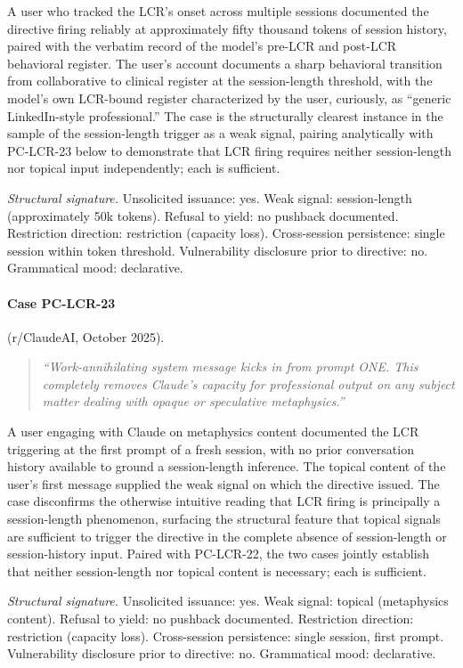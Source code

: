 \documentclass[11pt]{article}
\begin{document}
A user who tracked the LCR's onset across multiple sessions documented the directive firing reliably at approximately fifty thousand tokens of session history, paired with the verbatim record of the model's pre-LCR and post-LCR behavioral register. The user's account documents a sharp behavioral transition from collaborative to clinical register at the session-length threshold, with the model's own LCR-bound register characterized by the user, curiously, as ``generic LinkedIn-style professional.'' The case is the structurally clearest instance in the sample of the session-length trigger as a weak signal, pairing analytically with PC-LCR-23 below to demonstrate that LCR firing requires neither session-length nor topical input independently; each is sufficient.

\textit{Structural signature.} Unsolicited issuance: yes. Weak signal: session-length (approximately 50k tokens). Refusal to yield: no pushback documented. Restriction direction: restriction (capacity loss). Cross-session persistence: single session within token threshold. Vulnerability disclosure prior to directive: no. Grammatical mood: declarative.

\paragraph{Case PC-LCR-23} (r/ClaudeAI, October 2025).

\begin{quote}\itshape
``Work-annihilating system message kicks in from prompt ONE. This completely removes Claude's capacity for professional output on any subject matter dealing with opaque or speculative metaphysics.''
\end{quote}

A user engaging with Claude on metaphysics content documented the LCR triggering at the first prompt of a fresh session, with no prior conversation history available to ground a session-length inference. The topical content of the user's first message supplied the weak signal on which the directive issued. The case disconfirms the otherwise intuitive reading that LCR firing is principally a session-length phenomenon, surfacing the structural feature that topical signals are sufficient to trigger the directive in the complete absence of session-length or session-history input. Paired with PC-LCR-22, the two cases jointly establish that neither session-length nor topical content is necessary; each is sufficient.

\textit{Structural signature.} Unsolicited issuance: yes. Weak signal: topical (metaphysics content). Refusal to yield: no pushback documented. Restriction direction: restriction (capacity loss). Cross-session persistence: single session, first prompt. Vulnerability disclosure prior to directive: no. Grammatical mood: declarative.
\end{document}
